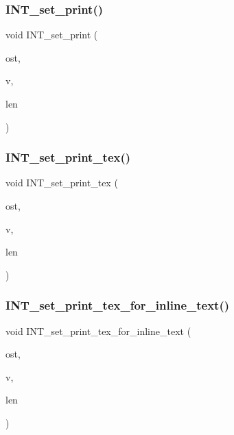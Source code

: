 \subsubsection{\texorpdfstring{I\+N\+T\+\_\+set\+\_\+print()}{INT\_set\_print()}\hspace{0.1cm}{\footnotesize\ttfamily [2/2]}}
{\footnotesize\ttfamily void I\+N\+T\+\_\+set\+\_\+print (\begin{DoxyParamCaption}\item[{ostream \&}]{ost,  }\item[{\mbox{\hyperlink{galois_8h_a09fddde158a3a20bd2dcadb609de11dc}{I\+NT}} $\ast$}]{v,  }\item[{\mbox{\hyperlink{galois_8h_a09fddde158a3a20bd2dcadb609de11dc}{I\+NT}}}]{len }\end{DoxyParamCaption})}

\mbox{\label{util_8_c_adad0666de5d38c0caa4769f9f4756c0b}} 
\subsubsection{\texorpdfstring{I\+N\+T\+\_\+set\+\_\+print\+\_\+tex()}{INT\_set\_print\_tex()}}
{\footnotesize\ttfamily void I\+N\+T\+\_\+set\+\_\+print\+\_\+tex (\begin{DoxyParamCaption}\item[{ostream \&}]{ost,  }\item[{\mbox{\hyperlink{galois_8h_a09fddde158a3a20bd2dcadb609de11dc}{I\+NT}} $\ast$}]{v,  }\item[{\mbox{\hyperlink{galois_8h_a09fddde158a3a20bd2dcadb609de11dc}{I\+NT}}}]{len }\end{DoxyParamCaption})}

\mbox{\label{util_8_c_a62f32a6d98d6c04e4073ba362867fe52}} 
\subsubsection{\texorpdfstring{I\+N\+T\+\_\+set\+\_\+print\+\_\+tex\+\_\+for\+\_\+inline\+\_\+text()}{INT\_set\_print\_tex\_for\_inline\_text()}}
{\footnotesize\ttfamily void I\+N\+T\+\_\+set\+\_\+print\+\_\+tex\+\_\+for\+\_\+inline\+\_\+text (\begin{DoxyParamCaption}\item[{ostream \&}]{ost,  }\item[{\mbox{\hyperlink{galois_8h_a09fddde158a3a20bd2dcadb609de11dc}{I\+NT}} $\ast$}]{v,  }\item[{\mbox{\hyperlink{galois_8h_a09fddde158a3a20bd2dcadb609de11dc}{I\+NT}}}]{len }\end{DoxyParamCaption})}

